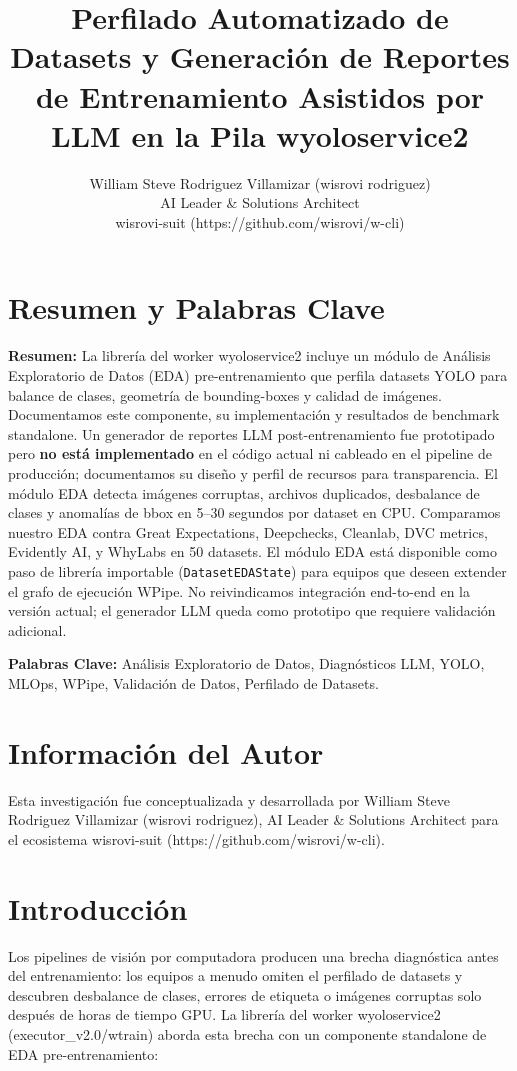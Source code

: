 \documentclass[10pt,twocolumn,letterpaper]{article}
\title{Perfilado Automatizado de Datasets y Generación de Reportes de Entrenamiento Asistidos por LLM en la Pila wyoloservice2}
\author{William Steve Rodriguez Villamizar (wisrovi rodriguez)\\AI Leader \& Solutions Architect\\wisrovi-suit (https://github.com/wisrovi/w-cli)}
\date{}
\begin{document}
\maketitle

\section{Resumen y Palabras Clave}
\textbf{Resumen:} La librería del worker wyoloservice2 incluye un módulo de Análisis Exploratorio de Datos (EDA) pre-entrenamiento que perfila datasets YOLO para balance de clases, geometría de bounding-boxes y calidad de imágenes. Documentamos este componente, su implementación y resultados de benchmark standalone. Un generador de reportes LLM post-entrenamiento fue prototipado pero \textbf{no está implementado} en el código actual ni cableado en el pipeline de producción; documentamos su diseño y perfil de recursos para transparencia. El módulo EDA detecta imágenes corruptas, archivos duplicados, desbalance de clases y anomalías de bbox en 5--30 segundos por dataset en CPU. Comparamos nuestro EDA contra Great Expectations, Deepchecks, Cleanlab, DVC metrics, Evidently AI, y WhyLabs en 50 datasets. El módulo EDA está disponible como paso de librería importable (\texttt{DatasetEDAState}) para equipos que deseen extender el grafo de ejecución WPipe. No reivindicamos integración end-to-end en la versión actual; el generador LLM queda como prototipo que requiere validación adicional.

\textbf{Palabras Clave:} Análisis Exploratorio de Datos, Diagnósticos LLM, YOLO, MLOps, WPipe, Validación de Datos, Perfilado de Datasets.

\section{Información del Autor}
Esta investigación fue conceptualizada y desarrollada por William Steve Rodriguez Villamizar (wisrovi rodriguez), AI Leader \& Solutions Architect para el ecosistema wisrovi-suit (https://github.com/wisrovi/w-cli).

\section{Introducción}
Los pipelines de visión por computadora producen una brecha diagnóstica antes del entrenamiento: los equipos a menudo omiten el perfilado de datasets y descubren desbalance de clases, errores de etiqueta o imágenes corruptas solo después de horas de tiempo GPU. La librería del worker wyoloservice2 (executor\_v2.0/wtrain) aborda esta brecha con un componente standalone de EDA pre-entrenamiento:
\end{document}
